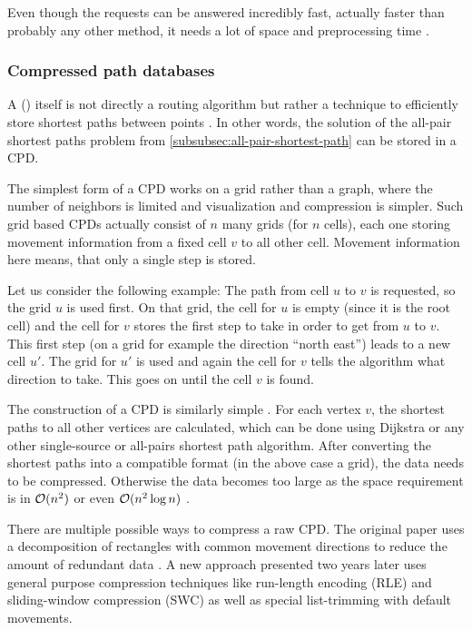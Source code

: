 			Even though the requests can be answered incredibly fast, actually faster than probably any other method, it needs a lot of space and preprocessing time \cite[23]{bast-transportation-networks}.
		
		\subsubsection{Compressed path databases}
		
			A  () itself is not directly a routing algorithm but rather a technique to efficiently store shortest paths between points \cite{botea-cpd-2013}.
			In other words, the solution of the all-pair shortest paths problem from \cref{subsubsec:all-pair-shortest-path} can be stored in a CPD.
			
			The simplest form of a CPD works on a grid rather than a graph, where the number of neighbors is limited and visualization and compression is simpler.
			Such grid based CPDs actually consist of $n$ many grids (for $n$ cells), each one storing movement information from a fixed cell $v$ to all other cell.
			Movement information here means, that only a single step is stored.
			
			Let us consider the following example:
			The path from cell $u$ to $v$ is requested, so the grid $u$ is used first.
			On that grid, the cell for $u$ is empty (since it is the root cell) and the cell for $v$ stores the first step to take in order to get from $u$ to $v$.
			This first step (on a grid for example the direction \enquote{north east}) leads to a new cell $u'$.
			The grid for $u'$ is used and again the cell for $v$ tells the algorithm what direction to take.
			This goes on until the cell $v$ is found.
			
			The construction of a CPD is similarly simple \cite[2]{botea-cpd-2013}.
			For each vertex $v$, the shortest paths to all other vertices are calculated, which can be done using Dijkstra or any other single-source or all-pairs shortest path algorithm.
			After converting the shortest paths into a compatible format (in the above case a grid), the data needs to be compressed.
			Otherwise the data becomes too large as the space requirement is in $\mathcal{O}(n^2)$ or even $\mathcal{O}(n^2 \log n)$ \cite[1]{botea-cpd-2013}.
			
			There are multiple possible ways to compress a raw CPD.
			The original paper uses a decomposition of rectangles with common movement directions to reduce the amount of redundant data \cite[1]{botea-cpd-2011}.
			A new approach presented two years later uses general purpose compression techniques like run-length encoding (RLE) and sliding-window compression (SWC) as well as special list-trimming with default movements.
			
